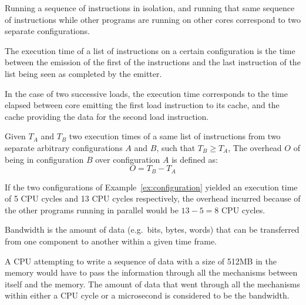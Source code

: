 \begin{example}[Configuration]
\label{ex:configuration}
Running a sequence of instructions in isolation, and running that same sequence
of instructions while other programs are running on other cores correspond to
two separate configurations.
\end{example}

\begin{definition}
The execution time of a list of instructions on a certain configuration is the
time between the emission of the first of the instructions and the last
instruction of the list being seen as completed by the emitter.
\end{definition}

\begin{example}
In the case of two successive loads, the execution time corresponds to the time
elapsed between core emitting the first load instruction to its cache, and the
cache providing the data for the second load instruction.
\end{example}


\begin{definition}[Overhead]
Given $T_A$ and $T_B$ two execution times of a same list of instructions from
two separate arbitrary configurations $A$ and $B$, such that $T_B \ge T_A$, The
overhead $O$ of being in configuration $B$ over configuration $A$ is defined as:
\[ O = T_B - T_A \]
\end{definition}

\begin{example}[Overhead]
If the two configurations of Example~\ref{ex:configuration} yielded an execution
time of 5 CPU cycles and 13 CPU cycles respectively, the overhead incurred
because of the other programs running in parallel would be $13 - 5 = 8$ CPU
cycles.
\end{example}

\begin{definition}[Bandwidth]
Bandwidth is the amount of data (e.g.~bits, bytes, words) that can be
transferred from one component to another within a given time frame.
\end{definition}

\begin{example}[Bandwidth]
A CPU attempting to write a sequence of data with a size of 512MB in the memory
would have to pass the information through all the mechanisms between itself and
the memory. The amount of data that went through all the mechanisms within
either a CPU cycle or a microsecond is considered to be the bandwidth.
\end{example}

